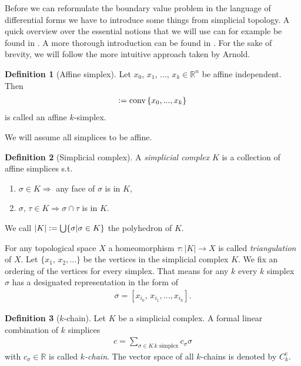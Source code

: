 \documentclass[12pt,a4paper]{article}
\theoremstyle{definition}
\newtheorem{definition}{Definition}
\newcommand{\real}{\mathbb{R}}
\begin{document}
Before we can reformulate the boundary value problem in the language of 
differential forms we have to 
introduce some things from simplicial topology. A quick overview over the
essential notions that we will use can for example be found in 
\cite[Chapter 2]{arnold}. A more thorough introduction can be found in 
\cite[Chapter 4]{topology_and_geometry}. For the sake of brevity, we will 
follow the more intuitive approach taken by Arnold.


\begin{definition}[Affine simplex]
    Let $x_0$, $x_1$, ..., $x_k \in \real^n$ be affine independent. Then 
    \begin{align*}
    [x_0,x_1,...,x_k] \vcentcolon= \text{conv}\,\{x_0,...,x_k\}
    \end{align*}
    is called an affine $k$-simplex.
\end{definition}
\noindent We will assume all simplices to be affine.

\begin{definition}[Simplicial complex]
    A \textit{simplicial complex} $K$ is a collection of affine simplices s.t.
    \begin{enumerate}
        \item $\sigma \in K \Rightarrow$ any face of $\sigma$ is in $K$,
        \item $\sigma,\, \tau \in K \Rightarrow \sigma \cap \tau$ is in $K$.
    \end{enumerate}
    We call $|K| \vcentcolon= \bigcup \{ \sigma | \sigma \in K\}$ the polyhedron of 
    $K$.
\end{definition}
For any topological space $X$ a homeomorphism 
$\tau: |K| \rightarrow X$ is called \textit{triangulation} of $X$.
Let $\{x_1,\, x_2,...\}$ be the vertices in the simplicial complex $K$.
We fix an ordering of the vertices for every simplex. 
That means for any $k$ every $k$ simplex $\sigma$ has
a designated representation in the form of
\begin{align*}
    \sigma = [x_{i_0},\, x_{i_1}, ...,x_{i_k}].
\end{align*} 

\begin{definition}[$k$-chain]
    Let $K$ be a simplicial complex. A formal linear combination of $k$ 
    simplices
    \begin{align*}
        c = \sum\limits_{\sigma \in K\, k \text{ simplex}} c_\sigma \sigma
    \end{align*}
    with $c_\sigma \in \real$ is called \textit{$k$-chain}. The vector space 
    of all $k$-chains is denoted by ${C}^\text{c}_k$.
\end{definition}
\end{document}
